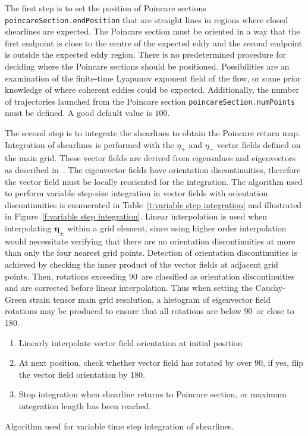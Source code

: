 \documentclass{article}
\begin{document}
The first step is to set the position of Poin\-care sections \texttt{poincare\-Section.endPosition} that are straight lines in regions where closed shearlines are expected. The Poincare section must be oriented in a way that the first endpoint is close to the centre of the expected eddy and the second endpoint is outside the expected eddy region. There is no predetermined procedure for deciding where the Poincare sections should be positioned. Possibilities are an examination of the finite-time Lyapunov exponent field of the flow, or some prior knowledge of where coherent eddies could be expected. Additionally, the number of trajectories launched from the Poincare section \texttt{poincareSection.numPoints} must be defined. A good default value is $100$.

The second step is to integrate the shearlines to obtain the Poincare return map. Integration of shearlines is performed with the $\eta_+$ and $\eta_-$ vector fields defined on the main grid. These vector fields are derived from eigenvalues and eigenvectors as described in~\textcite{farazmand12:_comput_lagran}. The eigenvector fields have orientation discontinuities, therefore the vector field must be locally reoriented for the integration. The algorithm used to perform variable step-size integration in vector fields with orientation discontinuities is enumerated in Table~\ref{t:variable step integration} and illustrated in Figure~\ref{f:variable step integration}. Linear interpolation is used when interpolating $\boldsymbol \eta_\pm$ within a grid element, since using higher order interpolation would necessitate verifying that there are no orientation discontinuities at more than only the four nearest grid points. Detection of orientation discontinuities is achieved by checking the inner product of the vector fields at adjacent grid points. Then, rotations exceeding 90\degree\, are classified as orientation discontinuities and are corrected before linear interpolation. Thus when setting the Cauchy-Green strain tensor main grid resolution, a histogram of eigenvector field rotations may be produced to ensure that all rotations are below 90\degree\, or close to 180\degree.

\begin{table}
\begin{enumerate}
\item Linearly interpolate vector field orientation at initial position
\item At next position, check whether vector field has rotated by over 90\degree, if yes, flip the vector field orientation by 180\degree.
\item Stop integration when shearline returns to Poincare section, or maximum integration length has been reached.
\end{enumerate}
\caption{Algorithm used for variable time step integration of shearlines.}
\label{t:variable step integration}
\end{table}
\end{document}
